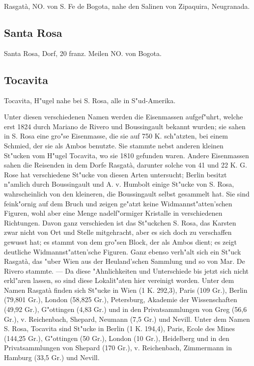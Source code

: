 \documentclass[a4paper, 11pt, oneside]{article}
\begin{document}
Rasgatà, NO. von S. Fe de Bogota, nahe den Salinen von Zipaquira, Neugranada.

\subsection{Santa Rosa}

Santa Rosa, Dorf, 20 franz. Meilen NO. von Bogota.

\subsection{Tocavita}

Tocavita, H"ugel nahe bei S. Rosa, alle in S"ud-Amerika.

Unter diesen verschiedenen Namen werden die Eisenmassen aufgef"uhrt, welche erst 1824 durch Mariano de Rivero und Boussingault bekannt wurden; sie sahen in S. Rosa eine gro"se Eisenmasse, die sie auf 750 K. sch"atzten, bei einem Schmied, der sie als Ambos benutzte. Sie stammte nebst anderen kleinen St"ucken vom H"ugel Tocavita, wo sie 1810 gefunden waren. Andere Eisenmassen sahen die Reisenden in dem Dorfe Rasgatà, darunter solche von 41 und 22 K. G. Rose hat verschiedene St"ucke von diesen Arten untersucht; Berlin besitzt n"amlich durch Boussingault und A. v. Humbolt einige St"ucke von S. Rosa, wahrscheinlich von den kleineren, die Boussingault selbst gesammelt hat. Sie sind feink"ornig auf dem Bruch und zeigen ge"atzt keine Widmannst"atten'schen Figuren, wohl aber eine Menge nadelf"ormiger Kristalle in verschiedenen Richtungen. Davon ganz verschieden ist das St"uckchen S. Rosa, das Karsten zwar nicht von Ort und Stelle mitgehracht, aber es sich doch zu verschaffen gewusst hat; es stammt von dem gro"sen Block, der als Ambos dient; es zeigt deutliche Widmannst"atten'sche Figuren. Ganz ebenso verh"alt sich ein St"uck Rasgatà, das "uber Wien aus der Heuland'schen Sammlung und so von Mar. De Rivero stammte. --- Da diese "Ahnlichkeiten und Unterschiede bis jetzt sich nicht erkl"aren lassen, so sind diese Lokalit"aten hier vereinigt worden. Unter dem Namen Rasgatà finden sich St"ucke in Wien (1 K. 292,3), Paris (109 Gr.), Berlin (79,801 Gr.), London (58,825 Gr.), Petersburg, Akademie der Wissenschaften (49,92 Gr.), G"ottingen (4,83 Gr.) und in den Privatsammlungen von Greg (56,6 Gr.), v. Reichenbach, Shepard, Neumann (7,5 Gr.) und Nevill. Unter dem Namen S. Rosa, Tocavita sind St"ucke in Berlin (1 K. 194,4), Paris, Ecole des Mines (144,25 Gr.), G"ottingen (50 Gr.), London (10 Gr.), Heidelberg und in den Privatsammlungen von Shepard (170 Gr.), v. Reichenbach, Zimmermann in Hamburg (33,5 Gr.) und Nevill.
\end{document}
